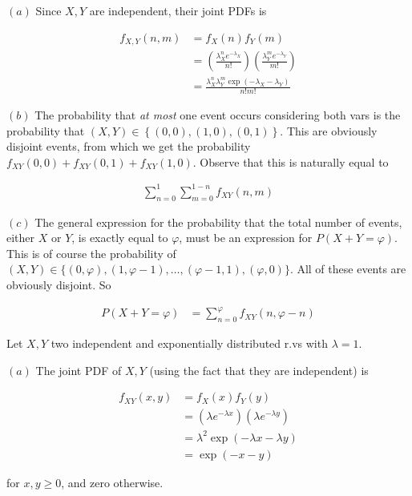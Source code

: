 \documentclass[a4paper, 12pt]{article}
\begin{document}
$(a)$ Since $X, Y$ are independent, their joint PDFs is 

\begin{align*}
    f_{X, Y}(n, m) &= f_X(n)f_Y(m) \\ 
                   &= \left( \frac{ \lambda_X^{n}e^{-\lambda_X} }{n!} \right) \left( \frac{\lambda_Y^m e^{-\lambda_Y}}{m!} \right)  \\ 
                   &=\frac{ \lambda_X^n \lambda_Y^m \exp( -\lambda_X - \lambda_Y )}{n!m!}
\end{align*}

$(b)$ The probability that \textit{at most} one event occurs considering both
vars is the probability that $(X, Y) \in \left\{ (0, 0), (1, 0), (0, 1)
\right\} $. This are obviously disjoint events, from which we get the
probability $f_{XY}(0, 0) + f_{XY}(0, 1) + f_{XY}(1, 0)$. Observe 
that this is naturally equal to 

\begin{align*}
    \sum_{n=0}^{1} \sum_{m=0}^{1 - n} f_{XY}(n, m)
\end{align*}

$(c)$ The general expression for the probability that the total number of
events, either $X$ or $Y$, is exactly equal to $\varphi$, must be an expression
for $P(X + Y = \varphi)$. This is of course the probability of $(X, Y) \in \{(0,
\varphi), (1, \varphi - 1), \ldots, (\varphi - 1, 1), (\varphi, 0)\}$.
All of these events are obviously disjoint. So

\begin{align*}
    P(X + Y = \varphi) &= \sum_{n=0}^{\varphi} f_{XY}(n, \varphi - n)
\end{align*}

\pagebreak 

Let $X, Y$ two independent and exponentially distributed r.vs with $\lambda = 1$.

$(a)$ The joint PDF of $X, Y$ (using the fact that they are independent) is 

\begin{align*}
    f_{XY}(x, y) &= f_X(x) f_Y(y) \\ 
                 &= \left( \lambda e^{-\lambda x} \right) \left( \lambda e^{- \lambda y} \right) \\ 
                 &=\lambda^2 \exp(-\lambda x - \lambda y) \\ 
                 &= \exp(-x - y)
\end{align*}

for $x, y \geq 0$, and zero otherwise.
\end{document}
